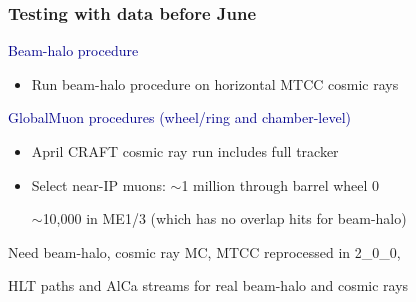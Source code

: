 \documentclass[compress]{beamer}
\begin{document}
\begin{frame}
\frametitle{Testing with data before June}

\textcolor{darkblue}{Beam-halo procedure}
\begin{itemize}\setlength{\itemsep}{0.1 cm}
\item Run beam-halo procedure on horizontal MTCC cosmic rays
\end{itemize}

\vfill
\textcolor{darkblue}{GlobalMuon procedures (wheel/ring and chamber-level)}
\begin{itemize}\setlength{\itemsep}{0.1 cm}
\item April CRAFT cosmic ray run includes full tracker
\item Select near-IP muons: $\sim$1 million through barrel wheel 0

$\sim$10,000 in ME1/3 (which has no overlap hits for beam-halo)
\end{itemize}

\vfill
Need beam-halo, cosmic ray MC, MTCC reprocessed in 2\_0\_0,

HLT paths and AlCa streams for real beam-halo and cosmic rays
\end{frame}
\end{document}
